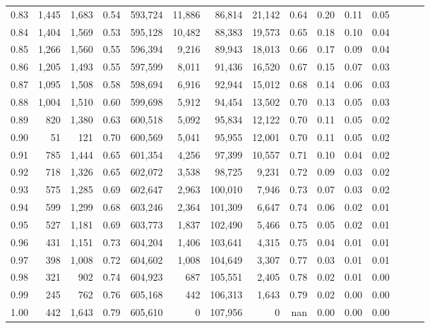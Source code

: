 \begin{tabular}{rrrrrrrrrrrrrrr}
0.83 &   1,445 &  1,683 &  0.54 &  593,724 &   11,886 &   86,814 &   21,142 &  0.64 &  0.20 &  0.11 &      0.05 \\
0.84 &   1,404 &  1,569 &  0.53 &  595,128 &   10,482 &   88,383 &   19,573 &  0.65 &  0.18 &  0.10 &      0.04 \\
0.85 &   1,266 &  1,560 &  0.55 &  596,394 &    9,216 &   89,943 &   18,013 &  0.66 &  0.17 &  0.09 &      0.04 \\
0.86 &   1,205 &  1,493 &  0.55 &  597,599 &    8,011 &   91,436 &   16,520 &  0.67 &  0.15 &  0.07 &      0.03 \\
0.87 &   1,095 &  1,508 &  0.58 &  598,694 &    6,916 &   92,944 &   15,012 &  0.68 &  0.14 &  0.06 &      0.03 \\
0.88 &   1,004 &  1,510 &  0.60 &  599,698 &    5,912 &   94,454 &   13,502 &  0.70 &  0.13 &  0.05 &      0.03 \\
0.89 &     820 &  1,380 &  0.63 &  600,518 &    5,092 &   95,834 &   12,122 &  0.70 &  0.11 &  0.05 &      0.02 \\
0.90 &      51 &    121 &  0.70 &  600,569 &    5,041 &   95,955 &   12,001 &  0.70 &  0.11 &  0.05 &      0.02 \\
0.91 &     785 &  1,444 &  0.65 &  601,354 &    4,256 &   97,399 &   10,557 &  0.71 &  0.10 &  0.04 &      0.02 \\
0.92 &     718 &  1,326 &  0.65 &  602,072 &    3,538 &   98,725 &    9,231 &  0.72 &  0.09 &  0.03 &      0.02 \\
0.93 &     575 &  1,285 &  0.69 &  602,647 &    2,963 &  100,010 &    7,946 &  0.73 &  0.07 &  0.03 &      0.02 \\
0.94 &     599 &  1,299 &  0.68 &  603,246 &    2,364 &  101,309 &    6,647 &  0.74 &  0.06 &  0.02 &      0.01 \\
0.95 &     527 &  1,181 &  0.69 &  603,773 &    1,837 &  102,490 &    5,466 &  0.75 &  0.05 &  0.02 &      0.01 \\
0.96 &     431 &  1,151 &  0.73 &  604,204 &    1,406 &  103,641 &    4,315 &  0.75 &  0.04 &  0.01 &      0.01 \\
0.97 &     398 &  1,008 &  0.72 &  604,602 &    1,008 &  104,649 &    3,307 &  0.77 &  0.03 &  0.01 &      0.01 \\
0.98 &     321 &    902 &  0.74 &  604,923 &      687 &  105,551 &    2,405 &  0.78 &  0.02 &  0.01 &      0.00 \\
0.99 &     245 &    762 &  0.76 &  605,168 &      442 &  106,313 &    1,643 &  0.79 &  0.02 &  0.00 &      0.00 \\
1.00 &     442 &  1,643 &  0.79 &  605,610 &        0 &  107,956 &        0 &   nan &  0.00 &  0.00 &      0.00 \\
\bottomrule
\end{tabular}
